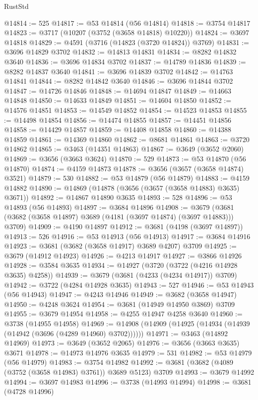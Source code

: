 \begin{lexlean}{RustStd}
\begin{coremodule}
@14814 := 525
@14817 := @53 @14814 (@56 @14814)
@14818 := @3754 @14817
@14823 := @3717 (@10207 (@3752 (@3658 @14818) @10220))
@14824 := @3697 @14818
@14829 := @4591 (@3716 (@14823 (@3720 @14824)) @3769)
@14831 := @3696 @14829 @3702
@14832 := @14813 @14831
@14834 := @8282 @14832 @3640
@14836 := @3696 @14834 @3702
@14837 := @14789 @14836
@14839 := @8282 @14837 @3640
@14841 := @3696 @14839 @3702
@14842 := @14763 @14841
@14844 := @8282 @14842 @3640
@14846 := @3696 @14844 @3702
@14847 := @14726 @14846
@14848 := @14694 @14847
@14849 := @14663 @14848
@14850 := @14633 @14849
@14851 := @14604 @14850
@14852 := @14576 @14851
@14853 := @14549 @14852
@14854 := @14523 @14853
@14855 := @14498 @14854
@14856 := @14474 @14855
@14857 := @14451 @14856
@14858 := @14429 @14857
@14859 := @14408 @14858
@14860 := @14388 @14859
@14861 := @14369 @14860
@14862 := @8681 @14861
@14863 := @3720 @14862
@14865 := @3463 (@14351 @14863)
@14867 := @3649 (@3652 @2060)
@14869 := @3656 (@3663 @3624)
@14870 := 529
@14873 := @53 @14870 (@56 @14870)
@14874 := @4159 @14873
@14878 := @3656 (@3657 (@3658 @14874) @3521)
@14879 := 530
@14882 := @53 @14879 (@56 @14879)
@14883 := @4159 @14882
@14890 := @14869 (@14878 (@3656 (@3657 (@3658 @14883) @3635) @3671))
@14892 := @14867 @14890 @3635
@14893 := 528
@14896 := @53 @14893 (@56 @14893)
@14897 := @3684 @14896
@14908 := @3679 (@3681 (@3682 (@3658 @14897) @3689 (@4181 (@3697 @14874) (@3697 @14883))) @3709)
@14909 := @4190 @14897
@14912 := @3681 (@4198 (@3697 @14897))
@14913 := 526
@14916 := @53 @14913 (@56 @14913)
@14917 := @3684 @14916
@14923 := @3681 (@3682 (@3658 @14917) @3689 @4207) @3709
@14925 := @3679 (@14912 @14923)
@14926 := @4213 @14917
@14927 := @3866 @14926
@14928 := @3584 @3635
@14934 := @14927 (@3720 (@3722 (@4216 @14928 @3635) @4258))
@14939 := @3679 (@3681 (@4233 (@4234 @14917)) @3709)
@14942 := @3722 (@4284 @14928 @3635)
@14943 := 527
@14946 := @53 @14943 (@56 @14943)
@14947 := @4243 @14946
@14949 := @3682 (@3658 @14947)
@14950 := @4248 @3624
@14954 := @3681 (@14949 @14950 @3869) @3709
@14955 := @3679 @14954
@14958 := @4255 @14947 @4258 @3640
@14960 := @3738 (@14955 @14958)
@14969 := @14908 (@14909 (@14925 (@14934 (@14939 (@14942 (@3696 (@4289 @14960) @3702))))))
@14971 := @3463 (@14892 @14969)
@14973 := @3649 (@3652 @2065)
@14976 := @3656 (@3663 @3635) @3671
@14978 := @14973 @14976 @3635
@14979 := 531
@14982 := @53 @14979 (@56 @14979)
@14983 := @3754 @14982
@14992 := @3681 (@3682 (@4089 (@3752 (@3658 @14983) @3761)) @3689 @5123) @3709
@14993 := @3679 @14992
@14994 := @3697 @14983
@14996 := @3738 (@14993 @14994)
@14998 := @3681 (@4728 @14996)

\end{coremodule}
\end{lexlean}
